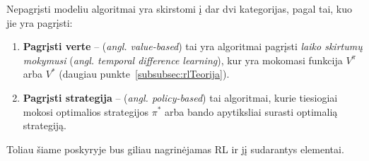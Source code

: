 \documentclass{VUMIFPSbakalaurinis}
\begin{document}
{	Nepagrįsti modeliu algoritmai yra skirstomi į dar dvi kategorijas, pagal tai, kuo jie yra pagrįsti:
	
	\begin{enumerate}
		\item \textbf{Pagrįsti verte} -- (\textit{angl. value-based}) tai yra algoritmai pagrįsti \textit{laiko skirtumų mokymusi} (\textit{angl. temporal difference learning}), kur yra mokomasi funkcija \(V^{\pi}\)  arba \(V^*\) (daugiau punkte~\ref{subsubsec:rlTeorija}).
		\item \textbf{Pagrįsti strategija} -- (\textit{angl. policy-based}) tai algoritmai, kurie tiesiogiai mokosi optimalios strategijos \(\pi^*\) arba bando apytiksliai surasti optimalią strategiją.
	\end{enumerate}

	Toliau šiame poskyryje bus giliau nagrinėjamas RL ir jį sudarantys elementai.
}
\end{document}
